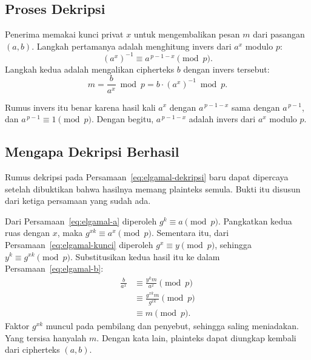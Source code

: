 \subsection{Proses Dekripsi}

Penerima memakai kunci privat $x$ untuk mengembalikan pesan $m$ dari pasangan
$(a, b)$. Langkah pertamanya adalah menghitung invers dari $a^{x}$ modulo $p$:
\begin{equation}
\left(a^{x}\right)^{-1} \equiv a^{\,p-1-x} \pmod{p} .
\label{eq:elgamal-invers}
\end{equation}
Langkah kedua adalah mengalikan cipherteks $b$ dengan invers tersebut:
\begin{equation}
m = \frac{b}{a^{x}} \bmod p = b \cdot \left(a^{x}\right)^{-1} \bmod p .
\label{eq:elgamal-dekripsi}
\end{equation}

Rumus invers itu benar karena hasil kali $a^{x}$ dengan $a^{\,p-1-x}$ sama
dengan $a^{\,p-1}$, dan $a^{\,p-1} \equiv 1 \pmod p$. Dengan begitu,
$a^{\,p-1-x}$ adalah invers dari $a^{x}$ modulo $p$.

\subsection{Mengapa Dekripsi Berhasil}
\label{subsec:bukti-elgamal}

Rumus dekripsi pada Persamaan~\eqref{eq:elgamal-dekripsi} baru dapat dipercaya
setelah dibuktikan bahwa hasilnya memang plainteks semula. Bukti itu disusun
dari ketiga persamaan yang sudah ada.

Dari Persamaan~\eqref{eq:elgamal-a} diperoleh $g^{k} \equiv a \pmod{p}$.
Pangkatkan kedua ruas dengan $x$, maka $g^{xk} \equiv a^{x} \pmod{p}$.
Sementara itu, dari Persamaan~\eqref{eq:elgamal-kunci} diperoleh
$g^{x} \equiv y \pmod{p}$, sehingga $y^{k} \equiv g^{xk} \pmod{p}$.
Substitusikan kedua hasil itu ke dalam Persamaan~\eqref{eq:elgamal-b}:
\begin{equation}
\begin{split}
\frac{b}{a^{x}} &\equiv \frac{y^{k} m}{a^{x}} \pmod{p} \\
                &\equiv \frac{g^{xk} m}{g^{xk}} \pmod{p} \\
                &\equiv m \pmod{p} .
\end{split}
\label{eq:elgamal-bukti}
\end{equation}
Faktor $g^{xk}$ muncul pada pembilang dan penyebut, sehingga saling
meniadakan. Yang tersisa hanyalah $m$. Dengan kata lain, plainteks dapat
diungkap kembali dari cipherteks $(a, b)$.


